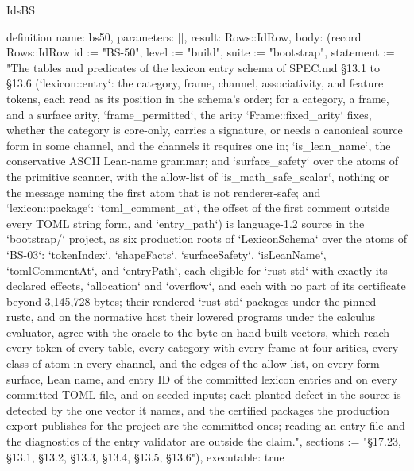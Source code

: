 \begin{lexlean}{IdsBS}
\begin{semanticmodule}
definition{
  name: bs50,
  parameters: [],
  result: Rows::IdRow,
  body: (record Rows::IdRow {id := "BS-50", level := "build", suite := "bootstrap", statement := "The tables and predicates of the lexicon entry schema of SPEC.md §13.1 to §13.6 (`lexicon::entry`: the category, frame, channel, associativity, and feature tokens, each read as its position in the schema's order; for a category, a frame, and a surface arity, `frame_permitted`, the arity `Frame::fixed_arity` fixes, whether the category is core-only, carries a signature, or needs a canonical source form in some channel, and the channels it requires one in; `is_lean_name`, the conservative ASCII Lean-name grammar; and `surface_safety` over the atoms of the primitive scanner, with the allow-list of `is_math_safe_scalar`, nothing or the message naming the first atom that is not renderer-safe; and `lexicon::package`: `toml_comment_at`, the offset of the first comment outside every TOML string form, and `entry_path`) is language-1.2 source in the `bootstrap/` project, as six production roots of `LexiconSchema` over the atoms of `BS-03`: `tokenIndex`, `shapeFacts`, `surfaceSafety`, `isLeanName`, `tomlCommentAt`, and `entryPath`, each eligible for `rust-std` with exactly its declared effects, `allocation` and `overflow`, and each with no part of its certificate beyond 3,145,728 bytes; their rendered `rust-std` packages under the pinned rustc, and on the normative host their lowered programs under the calculus evaluator, agree with the oracle to the byte on hand-built vectors, which reach every token of every table, every category with every frame at four arities, every class of atom in every channel, and the edges of the allow-list, on every form surface, Lean name, and entry ID of the committed lexicon entries and on every committed TOML file, and on seeded inputs; each planted defect in the source is detected by the one vector it names, and the certified packages the production export publishes for the project are the committed ones; reading an entry file and the diagnostics of the entry validator are outside the claim.", sections := "§17.23, §13.1, §13.2, §13.3, §13.4, §13.5, §13.6"}),
  executable: true
}


\end{semanticmodule}
\end{lexlean}
